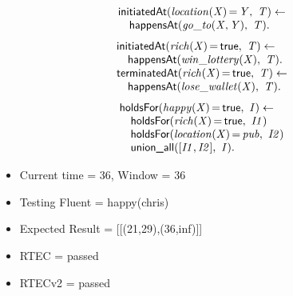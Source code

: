 \documentclass[8pt]{beamer}
\DeclareMathOperator{\val}{=}  %
\def \patsize {}
\def\happensAt{\textsf{\patsize happensAt}}
\def\holdsFor{\textsf{\patsize holdsFor}}
\def\initiatedAt{\textsf{\patsize initiatedAt}}
\def\terminatedAt{\textsf{\patsize terminatedAt}}
\def\unionall{\textsf{\patsize union\_all}}
\def\true{\textsf{\patsize true}}
\newenvironment{mysplit}%
  {\arraycolsep 0pt \begin{array}{l}}%
  {\end{array}}
\begin{document}
\begin{frame}
\begin{minipage}{0.48\linewidth}
        \begin{align*}
            \begin{mysplit}
                \initiatedAt\mathit{(location(X)\val Y,\ T) \leftarrow}\\
                \quad    \happensAt\mathit{(go\_to(X,Y),\ T).}
            \end{mysplit}
        \end{align*}
        \begin{align*}
            \begin{mysplit}
                \initiatedAt\mathit{(rich(X)\val\true,\ T) \leftarrow}\\
                \quad    \happensAt\mathit{(win\_lottery(X),\ T).}\\
                \terminatedAt\mathit{(rich(X)\val\true,\ T) \leftarrow}\\
                \quad    \happensAt\mathit{(lose\_wallet(X),\ T)}.\\
            \end{mysplit}
        \end{align*}
        \begin{align*}
            \begin{mysplit}
                \holdsFor\mathit{(happy(X)\val\true,\ I) \leftarrow}\\
                \quad    \holdsFor\mathit{(rich(X)\val\true,\ I1)}\\
                \quad    \holdsFor\mathit{(location(X)\val pub,\ I2)}\\
                \quad    \unionall\mathit{([I1,I2],\ I)}.
            \end{mysplit}
        \end{align*}
    \end{minipage}

    \begin{itemize}
        \item Current time = 36, Window = 36
        \item Testing Fluent = happy(chris) 
        \item Expected Result = [[(21,29),(36,inf)]] 
        \item RTEC = passed
        \item RTECv2 = passed
    \end{itemize}
\end{frame}
\end{document}
